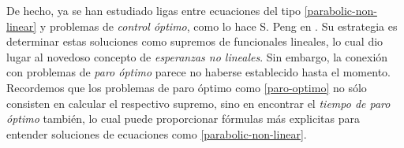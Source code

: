 \documentclass{article}
\numberwithin{equation}{section}
\begin{document}
De hecho, ya se han estudiado ligas entre ecuaciones del tipo \eqref{parabolic-non-linear} y problemas de \emph{control óptimo}, como lo hace S. Peng en \cite{peng2010nonlinear}. Su estrategia es determinar estas soluciones como supremos de funcionales lineales, lo cual dio lugar al novedoso concepto de \emph{esperanzas no lineales}. Sin embargo, la conexión con problemas de \emph{paro óptimo} parece no haberse establecido hasta el momento. Recordemos que los problemas de paro óptimo como \eqref{paro-optimo} no sólo consisten en calcular el respectivo supremo, sino en encontrar el \emph{tiempo de paro óptimo} también, lo cual puede proporcionar fórmulas más explicitas para entender soluciones de ecuaciones como \eqref{parabolic-non-linear}.


 
\end{document}
